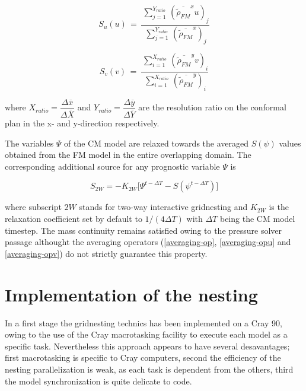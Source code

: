\begin{equation}
\label{averaging-opu}
 S_u ( u) \, = \, \dfrac{ \,
\sum_{j=1}^{Y_{ratio}} \, \left( \overline{\tilde{\rho}_{FM}}^{x} u \right)_{j}}
{ \,
\sum_{j=1}^{Y_{ratio}} \, \left( \overline{\tilde{\rho}_{FM}}^{x}   \right)_{j}}
\end{equation}

\begin{equation}
\label{averaging-opv}
 S_v ( v) \, = \, \dfrac{ \,
\sum_{i=1}^{X_{ratio}} \, \left( \overline{\tilde{\rho}_{FM}}^{y} v \right)_{i}}
{ \,
\sum_{i=1}^{X_{ratio}} \, \left( \overline{\tilde{\rho}_{FM}}^{y}   \right)_{i}}
\end{equation}

\noindent
where $X_{ratio}=\dfrac{\Delta \overline{x}}{\Delta \overline{X}}$
  and $Y_{ratio}=\dfrac{\Delta \overline{y}}{\Delta \overline{Y}}$ are the
resolution ratio on the conformal plan in the x- and y-direction respectively.

 The variables $\Psi$ of the CM model are relaxed towards the averaged
$S( \psi)$ values obtained from the FM model in the entire overlapping domain.
The corresponding additional source for any prognostic variable $\Psi$ is


\begin{equation}
\label{2w_relaxation}
S_{2W} = -K_{2W} \big[ \Psi^{t-\Delta T} - S ( \psi^{t-\Delta T}) \big]
\end{equation}

\noindent
where subscript $2W$ stands for two-way interactive gridnesting and $K_{2W}$
is the relaxation coefficient set by default to $1/(4\Delta T)$ with $\Delta T$
being the CM model timestep.
The mass continuity remains satisfied owing to the pressure solver passage
althought the averaging operators
(\ref{averaging-op}, \ref{averaging-opu} and \ref{averaging-opv}) do not
strictly guarantee this property.


\section{Implementation of the nesting}

In a first stage the gridnesting technics has been implemented on a Cray 90,
owing to the use of the Cray macrotasking facility to execute each model as a
specific task. Nevertheless this approach appears to have several desavantages;
first  macrotasking is specific to Cray computers, second the efficiency of
the nesting parallelization is weak, as each task is dependent from the others,
third the model synchronization is quite delicate to code.

